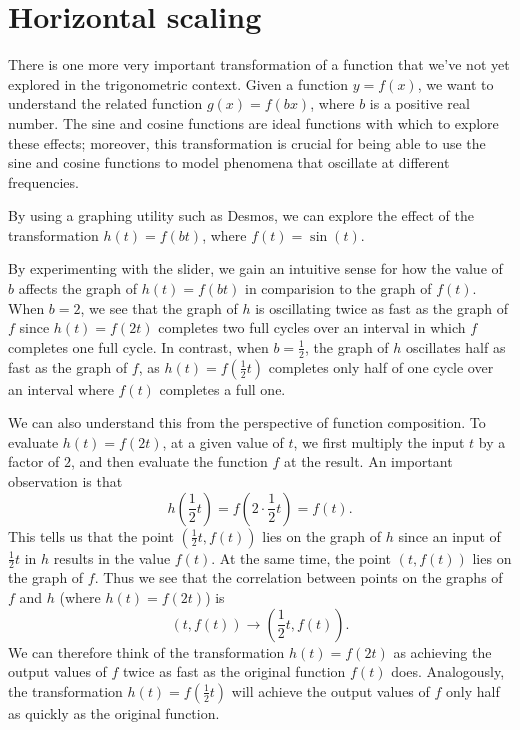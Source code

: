 \documentclass{ximera}
\begin{document}
%
%
%

\section{Horizontal scaling}

There is one more very important transformation of a function that we've not yet explored in the trigonometric context.  Given a function \(y = f(x)\), we want to understand the related function \(g(x) = f(bx)\), where \(b\) is a positive real number.  The sine and cosine functions are ideal functions with which to explore these effects; moreover, this transformation is crucial for being able to use the sine and cosine functions to model phenomena that oscillate at different frequencies.%

By using a graphing utility such as Desmos, we can explore the effect of the transformation \(h(t) = f(bt)\), where \(f(t) = \sin(t)\).%

\begin{center}  
\end{center}

By experimenting with the slider, we gain an intuitive sense for how the value of \(b\) affects the graph of \(h(t) = f(bt)\) in comparision to the graph of \(f(t)\).  When \(b = 2\), we see that the graph of \(h\) is oscillating twice as fast as the graph of \(f\) since \(h(t) = f(2t)\) completes two full cycles over an interval in which \(f\) completes one full cycle.  In contrast, when \(b = \frac{1}{2}\), the graph of \(h\) oscillates half as fast as the graph of \(f\), as \(h(t) = f\left(\frac{1}{2}t\right)\) completes only half of one cycle over an interval where \(f(t)\) completes a full one.%

We can also understand this from the perspective of function composition.  To evaluate \(h(t) = f(2t)\), at a given value of \(t\), we first multiply the input \(t\) by a factor of \(2\), and then evaluate the function \(f\) at the result.  An important observation is that%
\[
h\left( \frac{1}{2}t \right) = f\left( 2 \cdot \frac{1}{2}t \right) = f(t)\text{.}
\]
This tells us that the point \(\left(\frac{1}{2}t, f(t)\right)\) lies on the graph of \(h\) since an input of \(\frac{1}{2}t\) in \(h\) results in the value \(f(t)\).  At the same time, the point \((t,f(t))\) lies on the graph of \(f\).  Thus we see that the correlation between points on the graphs of \(f\) and \(h\) (where \(h(t) = f(2t)\)) is%
\[
(t, f(t)) \rightarrow \left( \frac{1}{2}t, f(t) \right)\text{.}
\]
We can therefore think of the transformation \(h(t) = f(2t)\) as achieving the output values of \(f\) twice as fast as the original function \(f(t)\) does.  Analogously, the transformation \(h(t) = f\left(\frac{1}{2}t\right)\) will achieve the output values of \(f\) only half as quickly as the original function.%
\end{document}
